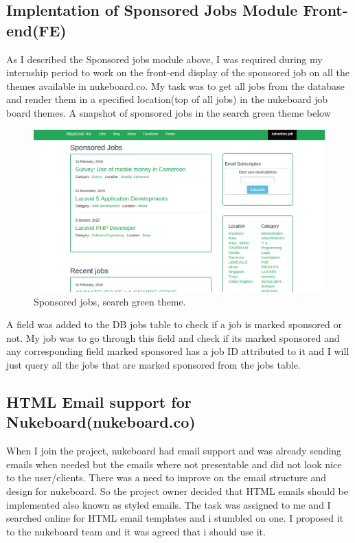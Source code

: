 \subsection{Implentation of Sponsored Jobs Module Front-end(FE)}

As I described the Sponsored jobs module above, I was required during my internship period to work on the front-end display of the sponsored job on all the themes available in nukeboard.co. My task was to get all jobs from the database and render them in a specified location(top of all jobs) in the nukeboard job board themes. A snapshot of sponsored jobs in the search green theme below

\begin{figure}[h]
\centering
\includegraphics[width=13cm,scale=1.5]{Figures/SponsoredJobFE}
\decoRule
\caption[Sponsored Jobs Front-end]{Sponsored jobs, search green theme.}
\label{fig:SponsoredJobFE}
\end{figure} 

A field was added to the DB jobs table to check if a job is marked sponsored or not. My job was to go through this field and check if its marked sponsored and any corresponding field marked sponsored has a job ID attributed to it and I will just query all the jobs that are marked sponsored from the jobs table.

\subsection{HTML Email support for Nukeboard(nukeboard.co)}

When I join the project, nukeboard had email support and was already sending emails when needed but the emails where not presentable and did not look nice to the user/clients. There was a need to improve on the email structure and design for nukeboard. So the project owner decided that HTML emails should be implemented also known as styled emails. The task was assigned to me and I searched online for HTML email templates and i stumbled on one. I proposed it to the nukeboard team and it was agreed that i should use it. \\

